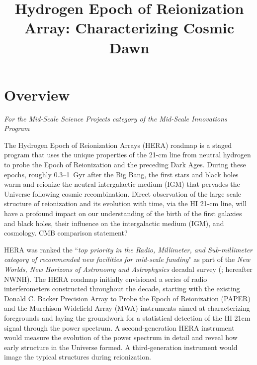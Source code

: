 \documentclass[preprint]{aastex}
\def\HI{{H{\small I }}}
\begin{document}
\title{Hydrogen Epoch of Reionization Array: Characterizing Cosmic Dawn}

\section{Overview} %



{\it For the Mid-Scale Science Projects category of the Mid-Scale
Innovations Program}

The Hydrogen Epoch of Reionization Arrays (HERA) roadmap is a staged
program that uses the unique properties of the 21-cm line from neutral
hydrogen to probe the Epoch of Reionization and the preceding Dark
Ages.  During these epochs, roughly 0.3--1~Gyr after the Big Bang, the
first stars and black holes warm and reionize the neutral
intergalactic medium (IGM) that pervades the Universe following cosmic
recombination. Direct observation of the large scale structure of
reionization and its evolution with time, via the \HI 21-cm line, will
have a profound impact on our understanding of the birth of the first
galaxies and black holes, their influence on the intergalactic medium
(IGM), and cosmology.  CMB comparison statement? 

HERA was ranked the ``{\it top priority in the Radio, Millimeter, and
Sub-millimeter category of recommended new facilities for mid-scale
funding}" as part of the {\it New Worlds, New Horizons of Astronomy
and Astrophysics} decadal survey (\citealt{astro2010}; hereafter
NWNH).  The HERA roadmap initially envisioned a series of radio
interferometers constructed throughout the decade, starting with the
existing Donald C. Backer Precision Array to Probe the Epoch of
Reionization (PAPER) and the Murchison Widefield Array (MWA)
instruments aimed at characterizing foregrounds and laying the
groundwork for a statistical detection of the HI 21cm signal through
the power spectrum.  A second-generation HERA instrument would measure
the evolution of the power spectrum in detail and reveal how early
structure in the Universe formed. A third-generation instrument would
image the typical structures during reionization.
\end{document}
